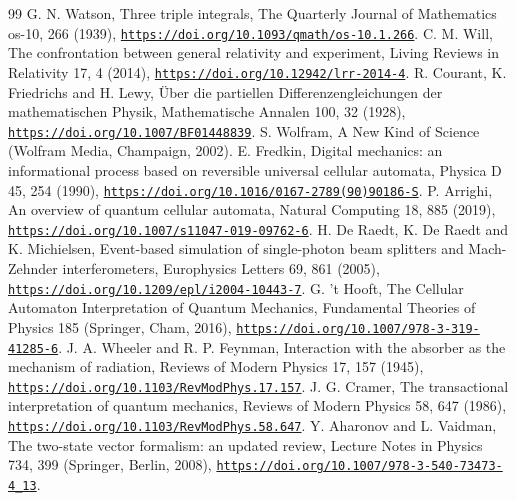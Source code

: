 \documentclass[pdflatex,sn-mathphys-num]{sn-jnl}
\theoremstyle{thmstyleone}
\begin{document}
\begin{thebibliography}{99}\setlength{\itemsep}{0pt}\setlength{\parsep}{0pt}
 G. N. Watson, Three triple integrals, The Quarterly Journal of Mathematics os-10, 266 (1939), \href{https://doi.org/10.1093/qmath/os-10.1.266}{\nolinkurl{https://doi.org/10.1093/qmath/os-10.1.266}}.
 C. M. Will, The confrontation between general relativity and experiment, Living Reviews in Relativity 17, 4 (2014), \href{https://doi.org/10.12942/lrr-2014-4}{\nolinkurl{https://doi.org/10.12942/lrr-2014-4}}.
 R. Courant, K. Friedrichs and H. Lewy, \"Uber die partiellen Differenzengleichungen der mathematischen Physik, Mathematische Annalen 100, 32 (1928), \href{https://doi.org/10.1007/BF01448839}{\nolinkurl{https://doi.org/10.1007/BF01448839}}.
 S. Wolfram, A New Kind of Science (Wolfram Media, Champaign, 2002).
 E. Fredkin, Digital mechanics: an informational process based on reversible universal cellular automata, Physica D 45, 254 (1990), \href{https://doi.org/10.1016/0167-2789(90)90186-S}{\nolinkurl{https://doi.org/10.1016/0167-2789(90)90186-S}}.
 P. Arrighi, An overview of quantum cellular automata, Natural Computing 18, 885 (2019), \href{https://doi.org/10.1007/s11047-019-09762-6}{\nolinkurl{https://doi.org/10.1007/s11047-019-09762-6}}.
 H. De Raedt, K. De Raedt and K. Michielsen, Event-based simulation of single-photon beam splitters and Mach-Zehnder interferometers, Europhysics Letters 69, 861 (2005), \href{https://doi.org/10.1209/epl/i2004-10443-7}{\nolinkurl{https://doi.org/10.1209/epl/i2004-10443-7}}.
 G. 't Hooft, The Cellular Automaton Interpretation of Quantum Mechanics, Fundamental Theories of Physics 185 (Springer, Cham, 2016), \href{https://doi.org/10.1007/978-3-319-41285-6}{\nolinkurl{https://doi.org/10.1007/978-3-319-41285-6}}.
 J. A. Wheeler and R. P. Feynman, Interaction with the absorber as the mechanism of radiation, Reviews of Modern Physics 17, 157 (1945), \href{https://doi.org/10.1103/RevModPhys.17.157}{\nolinkurl{https://doi.org/10.1103/RevModPhys.17.157}}.
 J. G. Cramer, The transactional interpretation of quantum mechanics, Reviews of Modern Physics 58, 647 (1986), \href{https://doi.org/10.1103/RevModPhys.58.647}{\nolinkurl{https://doi.org/10.1103/RevModPhys.58.647}}.
 Y. Aharonov and L. Vaidman, The two-state vector formalism: an updated review, Lecture Notes in Physics 734, 399 (Springer, Berlin, 2008), \href{https://doi.org/10.1007/978-3-540-73473-4_13}{\nolinkurl{https://doi.org/10.1007/978-3-540-73473-4_13}}.

\end{thebibliography}
\end{document}
